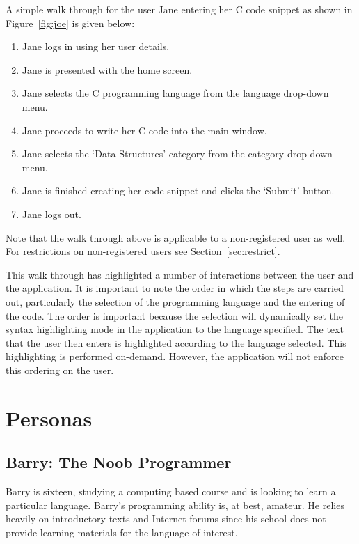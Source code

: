 \documentclass[11pt,a4paper]{article}
\begin{document}
A simple walk through for the user Jane entering her C code snippet as
shown in Figure~\ref{fig:joe} is given below:

\begin{enumerate}
\item Jane logs in using her user details.
\item Jane is presented with the home screen.
\item Jane selects the C programming language from the language drop-down
menu.
\item Jane proceeds to write her C code into the main window.
\item Jane selects the `Data Structures' category from the category
drop-down menu.
\item Jane is finished creating her code snippet and clicks the `Submit'
button.
\item Jane logs out.
\end{enumerate}

Note that the walk through above is applicable to a non-registered user
as well. For restrictions on non-registered users see
Section~\ref{sec:restrict}.

This walk through has highlighted a number of interactions between the
user and the application. It is important to note the order in which
the steps are carried out, particularly the selection of the
programming language and the entering of the code. The order is
important because the selection will dynamically set the syntax
highlighting mode in the application to the language specified.
The text that the user then enters is highlighted according to the
language selected. This highlighting is performed on-demand. %
However, the application will not enforce this ordering on the user.

\newpage

\section{Personas}

\subsection{Barry: The Noob Programmer}
\label{sec:barry} 

Barry is sixteen, studying a computing based course and is looking to
learn a particular language. Barry's programming ability is, at best,
amateur. He relies heavily on introductory texts and Internet forums
since his school does not provide learning materials for the language
of interest.
\end{document}
